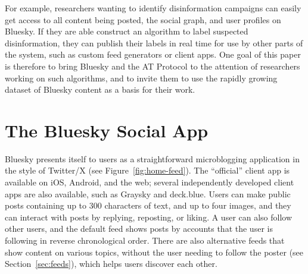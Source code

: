 \documentclass[sigconf,review]{acmart}
\begin{document}
For example, researchers wanting to identify disinformation campaigns can easily get access to all content being posted, the social graph, and user profiles on Bluesky.
If they are able construct an algorithm to label suspected disinformation, they can publish their labels in real time for use by other parts of the system, such as custom feed generators or client apps.
One goal of this paper is therefore to bring Bluesky and the AT Protocol to the attention of researchers working on such algorithms, and to invite them to use the rapidly growing dataset of Bluesky content as a basis for their work.

\section{The Bluesky Social App}\label{sec:product}

Bluesky presents itself to users as a straightforward microblogging application in the style of Twitter/X (see Figure~\ref{fig:home-feed}).
The ``official'' client app is available on iOS, Android, and the web; several independently developed client apps are also available, such as Graysky and deck.blue. %
Users can make public posts containing up to 300 characters of text, and up to four images, and they can interact with posts by replying, reposting, or liking.
A user can also follow other users, and the default feed shows posts by accounts that the user is following in reverse chronological order.
There are also alternative feeds that show content on various topics, without the user needing to follow the poster (see Section~\ref{sec:feeds}), which helps users discover each other.
\end{document}
